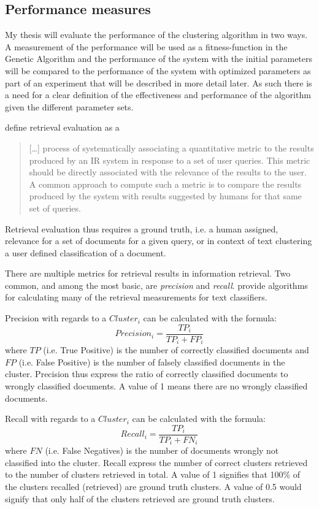 \subsection{Performance measures}
My thesis will evaluate the performance of the clustering algorithm in two ways. A measurement of the performance will be used as a fitness-function in the Genetic Algorithm and the performance of the system with the initial parameters will be compared to the performance of the system with optimized parameters as part of an experiment that will be described in more detail later. As such there is a need for a clear definition of the effectiveness and performance of the \CTC algorithm given the different parameter sets.

\cite[131]{Baeza-Yates2011b} define retrieval evaluation as a \begin{quote} 
[\dots] process of systematically associating a quantitative metric to the results produced by an IR system in response to a set of user queries. This metric should be directly associated with the relevance of the results to the user. A common approach to compute such a metric is to compare the results produced by the system with results suggested by humans for that same set of queries.
\end{quote}
Retrieval evaluation thus requires a ground truth, i.e. a human assigned, relevance for a set of documents for a given query, or in context of text clustering a user defined classification of a document.

There are multiple metrics for retrieval results in information retrieval. Two common, and among the most basic, are \textit{precision} and \textit{recall}. \cite{Sebastiani2002} provide algorithms for calculating many of the retrieval measurements for text classifiers.

Precision with regards to a \(Cluster_{i}\) can be calculated with the formula:
\begin{displaymath}
Precision_{i} = 
\frac{TP_{i}}{TP_{i} + FP_{i}}
\end{displaymath}
where \(TP\) (i.e. True Positive) is the number of correctly classified documents and \(FP\) (i.e. False Positive) is the number of falsely classified documents in the cluster. Precision thus express the ratio of correctly classified documents to wrongly classified documents. A value of 1 means there are no wrongly classified documents.

Recall with regards to a \(Cluster_{i}\) can be calculated with the formula: 
\begin{displaymath}
Recall_{i} = 
\frac{TP_{i}}{TP_{i} + FN_{i}}
\end{displaymath}
where \(FN\) (i.e. False Negatives) is the number of documents wrongly not classified into the cluster. Recall express the number of correct clusters retrieved to the number of clusters retrieved in total. A value of 1 signifies that 100\% of the clusters recalled (retrieved) are ground truth clusters. A value of 0.5 would signify that only half of the clusters retrieved are ground truth clusters.


